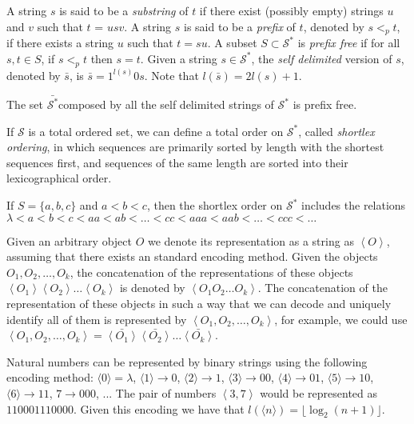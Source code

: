 A string $s$ is said to be a \emph{substring} of $t$ if there exist (possibly empty) strings $u$ and $v$ such that $t$ = $usv$. A string $s$ is said to be a \emph{prefix} of $t$, denoted by $s <_p t$, if there exists a string $u$ such that $t = su$. A subset $S \subset \mathcal{S}^{\ast}$ is \emph{prefix free} if for all $s, t \in S$, if $s <_p t$ then $s = t$. Given a string $s \in \mathcal{S}^{\ast}$, the \emph{self delimited} version of $s$, denoted by $\bar{s}$, is $\bar{s} = 1^{l(s)}0s$. Note that $l(\bar{s}) = 2l(s)+1$.

\begin{example}
The set $\bar{\mathcal{S}^{\ast}}$composed by all the self delimited strings of $\mathcal{S}^{\ast}$ is prefix free.
\end{example}

If $\mathcal{S}$ is a total ordered set, we can define a total order on $\mathcal{S}^{\ast}$, called \emph{shortlex ordering}, in which sequences are primarily sorted by length with the shortest sequences first, and sequences of the same length are sorted into their lexicographical order.

\begin{example}
If $S = \{a, b, c\}$ and $a < b < c$, then the shortlex order on $\mathcal{S}^{\ast}$ includes the relations $\lambda < a < b < c < aa < ab < \ldots < cc < aaa < aab < \ldots < ccc < \ldots$
\end{example}

Given an arbitrary object $O$ we denote its representation as a string as $\left\langle O\right\rangle$, assuming that there exists an standard encoding method. Given the objects $O_{1},O_{2},\ldots,O_{k}$, the concatenation of the representations of these objects $\left\langle O_1 \right\rangle \left\langle O_2 \right\rangle \ldots \left\langle O_k \right\rangle$ is denoted by $\left\langle O_1 O_2 \ldots O_k \right\rangle$. The concatenation of the representation of these objects in such a way that we can decode and uniquely identify all of them is represented by $\left\langle O_1, O_2,\ldots,O_k \right\rangle$, for example, we could use $\left\langle O_1, O_2,\ldots,O_k \right\rangle = \bar{\left\langle O_1 \right\rangle} \bar{\left\langle O_2 \right\rangle} \ldots \bar{\left\langle O_k \right\rangle}$.

\begin{example}
Natural numbers can be represented by binary strings using the following encoding method: $\langle 0 \rangle = \lambda$, $\langle 1 \rangle \rightarrow 0$, $\langle 2 \rangle \rightarrow 1$, $\langle 3 \rangle \rightarrow 00$, $\langle 4 \rangle \rightarrow 01$, $\langle 5 \rangle \rightarrow 10$, $\langle 6 \rangle \rightarrow 11$, $7 \rightarrow 000$, ... The pair of numbers $\left\langle 3, 7 \right\rangle$ would be represented as $110001110000$. Given this encoding we have that $l \left( \langle n \rangle \right) = \lfloor \log_2 (n + 1) \rfloor$.
\end{example}

